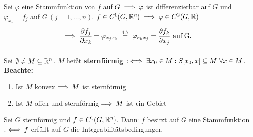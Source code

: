 \documentclass[a4paper,oneside,DIV15,BCOR12mm,chapterprefix=true,headings=onelinechapter]{scrbook}
\begin{document}
\begin{beweis}
Sei $\varphi$ eine Stammfunktion von $f$ auf $G\implies\varphi$ ist differenzierbar auf $G$ und $\varphi_{x_j}=f_j$ auf $G\ (j=1,\ldots,n)$. $f\in C^1(G,\mathbb{R}^n)\implies\varphi\in C^2(G,\mathbb{R})$
$$\folgt \frac{\partial f_j}{\partial x_k}=\varphi_{x_jx_k}\gleichnach{4.7}\varphi_{x_kx_j}=\frac{\partial f_k}{\partial x_j}\text{ auf G.}$$ $ $
\end{beweis}

\begin{definition*}
Sei $\emptyset\ne M\subseteq\mathbb{R}^n$. $M$ heißt \textbf{sternförmig} $:\equizu\exists x_0\in M: S[x_0,x]\subseteq M\ \forall x\in M$.\\
\textbf{Beachte:}
\begin{enumerate}
\item Ist $M$ konvex$\implies M$ ist sternförmig
\item Ist $M$ offen und sternförmig$\implies M$ ist ein Gebiet
\end{enumerate}
\end{definition*}

\begin{satz}
Sei $G$ sternförmig und $f\in C^1(G,\mathbb{R}^n)$. Dann: $f$ besitzt auf $G$ eine Stammfunktion $:\iff f$ erfüllt auf $G$ die Integrabilitätsbedingungen
\end{satz}
\end{document}
